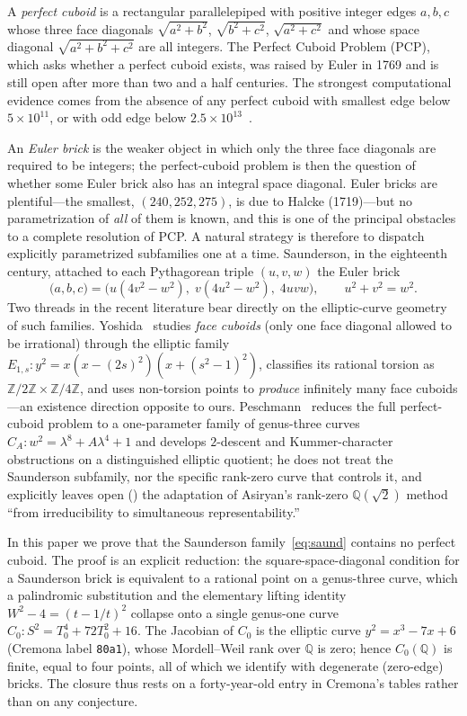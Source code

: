 \documentclass[11pt,reqno]{amsart}
\theoremstyle{plain}
\theoremstyle{definition}
\newcommand{\Q}{\mathbb{Q}}
\newcommand{\Z}{\mathbb{Z}}
\begin{document}
A \emph{perfect cuboid} is a rectangular parallelepiped with positive integer
edges $a,b,c$ whose three face diagonals $\sqrt{a^2+b^2}$, $\sqrt{b^2+c^2}$,
$\sqrt{a^2+c^2}$ and whose space diagonal $\sqrt{a^2+b^2+c^2}$ are all integers.
The Perfect Cuboid Problem (PCP), which asks whether a perfect cuboid exists,
was raised by Euler in 1769 and is still open after more than two and a half
centuries. The strongest computational evidence comes from the absence of any
perfect cuboid with smallest edge below $5\times10^{11}$, or with odd edge below
$2.5\times10^{13}$~\cite{matson}.

An \emph{Euler brick} is the weaker object in which only the three face
diagonals are required to be integers; the perfect-cuboid problem is then the
question of whether some Euler brick also has an integral space diagonal.
Euler bricks are plentiful---the smallest, $(240,252,275)$, is due to Halcke
(1719)---but no parametrization of \emph{all} of them is known, and this is one
of the principal obstacles to a complete resolution of PCP. A natural strategy
is therefore to dispatch explicitly parametrized subfamilies one at a time.
Saunderson, in the eighteenth century, attached to each Pythagorean triple
$(u,v,w)$ the Euler brick
\begin{equation}\label{eq:saund}
\bigl(a,b,c\bigr)=\bigl(u(4v^2-w^2),\;v(4u^2-w^2),\;4uvw\bigr),
\qquad u^2+v^2=w^2 .
\end{equation}
Two threads in the recent literature bear directly on the elliptic-curve
geometry of such families. Yoshida~\cite{yoshida} studies \emph{face cuboids}
(only one face diagonal allowed to be irrational) through the elliptic family
$E_{1,s}:y^2=x(x-(2s)^2)(x+(s^2-1)^2)$, classifies its rational torsion as
$\Z/2\Z\times\Z/4\Z$, and uses non-torsion points to \emph{produce} infinitely
many face cuboids---an existence direction opposite to ours.
Peschmann~\cite{peschmann} reduces the full perfect-cuboid problem to a
one-parameter
family of genus-three curves $C_A:w^2=\lambda^8+A\lambda^4+1$ and develops
$2$-descent and Kummer-character obstructions on a distinguished elliptic
quotient; he does not treat the Saunderson subfamily, nor the specific
rank-zero curve that controls it, and explicitly leaves open
(\cite[\S8]{peschmann}) the adaptation of Asiryan's rank-zero
$\Q(\sqrt2)$ method ``from irreducibility to simultaneous representability.''

In this paper we prove that the Saunderson family~\eqref{eq:saund} contains no
perfect cuboid. The proof is an explicit reduction: the square-space-diagonal
condition for a Saunderson brick is equivalent to a rational point on a
genus-three curve, which a palindromic substitution and the elementary lifting
identity $W^2-4=(t-1/t)^2$ collapse onto a single genus-one curve
$C_0:S^2=T_0^4+72T_0^2+16$. The Jacobian of $C_0$ is the elliptic curve
$y^2=x^3-7x+6$ (Cremona label \texttt{80a1}), whose Mordell--Weil rank over
$\Q$ is zero; hence $C_0(\Q)$ is finite, equal to four points, all of which we
identify with degenerate (zero-edge) bricks. The closure thus rests on a
forty-year-old entry in Cremona's tables rather than on any conjecture.
\end{document}
